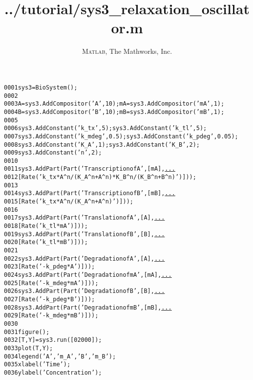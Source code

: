 \documentclass[a4paper,10pt]{article}
\title{../tutorial/sys3_relaxation_oscillator.m}
\author{\textsc{Matlab}, The Mathworks, Inc.}
\begin{document}
\begin{alltt}
0001 sys3 = BioSystem();
0002 
0003 A = sys3.AddCompositor(\textcolor{string}{'A'}, 10); mA = sys3.AddCompositor(\textcolor{string}{'mA'}, 1);
0004 B = sys3.AddCompositor(\textcolor{string}{'B'}, 10); mB = sys3.AddCompositor(\textcolor{string}{'mB'}, 1);
0005 
0006 sys3.AddConstant(\textcolor{string}{'k\_tx'}, 5); sys3.AddConstant(\textcolor{string}{'k\_tl'}, 5);
0007 sys3.AddConstant(\textcolor{string}{'k\_mdeg'}, 0.5); sys3.AddConstant(\textcolor{string}{'k\_pdeg'}, 0.05);
0008 sys3.AddConstant(\textcolor{string}{'K\_A'}, 1); sys3.AddConstant(\textcolor{string}{'K\_B'}, 2);
0009 sys3.AddConstant(\textcolor{string}{'n'}, 2);
0010 
0011 sys3.AddPart(Part(\textcolor{string}{'Transcription of A'}, [mA], \textcolor{keyword}{\underline{...}}
0012     [ Rate(\textcolor{string}{'k\_tx * A\^{}n / (K\_A\^{}n + A\^{}n) * K\_B\^{}n / (K\_B\^{}n + B\^{}n)'}) ]));
0013 
0014 sys3.AddPart(Part(\textcolor{string}{'Transcription of B'}, [mB], \textcolor{keyword}{\underline{...}}
0015     [ Rate(\textcolor{string}{'k\_tx * A\^{}n / (K\_A\^{}n + A\^{}n)'}) ]));
0016 
0017 sys3.AddPart(Part(\textcolor{string}{'Translation of A'}, [A], \textcolor{keyword}{\underline{...}}
0018     [ Rate(\textcolor{string}{'k\_tl * mA'}) ]));
0019 sys3.AddPart(Part(\textcolor{string}{'Translation of B'}, [B], \textcolor{keyword}{\underline{...}}
0020     [ Rate(\textcolor{string}{'k\_tl * mB'}) ]));
0021 
0022 sys3.AddPart(Part(\textcolor{string}{'Degradation of A'}, [A], \textcolor{keyword}{\underline{...}}
0023     [ Rate(\textcolor{string}{'- k\_pdeg * A'}) ]));
0024 sys3.AddPart(Part(\textcolor{string}{'Degradation of mA'}, [mA], \textcolor{keyword}{\underline{...}}
0025     [ Rate(\textcolor{string}{'- k\_mdeg * mA'}) ]));
0026 sys3.AddPart(Part(\textcolor{string}{'Degradation of B'}, [B], \textcolor{keyword}{\underline{...}}
0027     [ Rate(\textcolor{string}{'- k\_pdeg * B'}) ]));
0028 sys3.AddPart(Part(\textcolor{string}{'Degradation of mB'}, [mB], \textcolor{keyword}{\underline{...}}
0029     [ Rate(\textcolor{string}{'- k\_mdeg * mB'}) ]));
0030 
0031 figure();
0032 [T, Y] = sys3.run([0 2000]);
0033 plot(T, Y);
0034 legend(\textcolor{string}{'A'}, \textcolor{string}{'m\_A'}, \textcolor{string}{'B'}, \textcolor{string}{'m\_B'});
0035 xlabel(\textcolor{string}{'Time'});
0036 ylabel(\textcolor{string}{'Concentration'});
\end{alltt}
\end{document}
